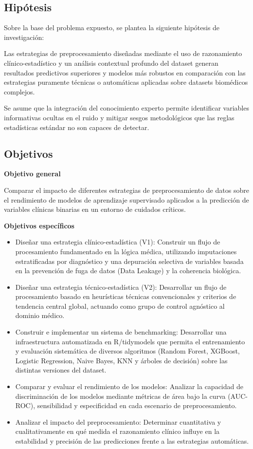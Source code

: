 \subsection{Hipótesis}\label{sec:hipotesis}

Sobre la base del problema expuesto, se plantea la siguiente hipótesis de
investigación:

Las estrategias de preprocesamiento diseñadas mediante el uso de razonamiento
clínico-estadístico y un análisis contextual profundo del dataset generan
resultados predictivos superiores y modelos más robustos en comparación con las
estrategias puramente técnicas o automáticas aplicadas sobre datasets biomédicos
complejos.

Se asume que la integración del conocimiento experto permite identificar
variables informativas ocultas en el ruido y mitigar sesgos metodológicos que
las reglas estadísticas estándar no son capaces de detectar.

\subsection{Objetivos}

\textbf{Objetivo general}

Comparar el impacto de diferentes estrategias de preprocesamiento de datos sobre
el rendimiento de modelos de aprendizaje supervisado aplicados a la predicción
de variables clínicas binarias en un entorno de cuidados críticos.

\textbf{Objetivos específicos}

\begin{itemize}
  \item Diseñar una estrategia clínico-estadística (V1): Construir un flujo de
    procesamiento fundamentado en la lógica médica, utilizando imputaciones
    estratificadas por diagnóstico y una depuración selectiva de variables
    basada en la prevención de fuga de datos (Data Leakage) y la coherencia biológica.
  \item Diseñar una estrategia técnico-estadística (V2): Desarrollar un flujo de
    procesamiento basado en heurísticas técnicas convencionales y criterios de
    tendencia central global, actuando como grupo de control agnóstico al
    dominio médico.
  \item Construir e implementar un sistema de benchmarking: Desarrollar una
    infraestructura automatizada en R/tidymodels que permita el entrenamiento y
    evaluación sistemática de diversos algoritmos (Random Forest, XGBoost,
    Logistic Regression, Naive Bayes, KNN y árboles de decisión) sobre las
    distintas versiones del dataset.
  \item Comparar y evaluar el rendimiento de los modelos: Analizar la capacidad de
    discriminación de los modelos mediante métricas de área bajo la curva
    (AUC-ROC), sensibilidad y especificidad en cada escenario de
    preprocesamiento.
  \item Analizar el impacto del preprocesamiento: Determinar cuantitativa y
    cualitativamente en qué medida el razonamiento clínico influye en la
    estabilidad y precisión de las predicciones frente a las estrategias
    automáticas.
\end{itemize}

